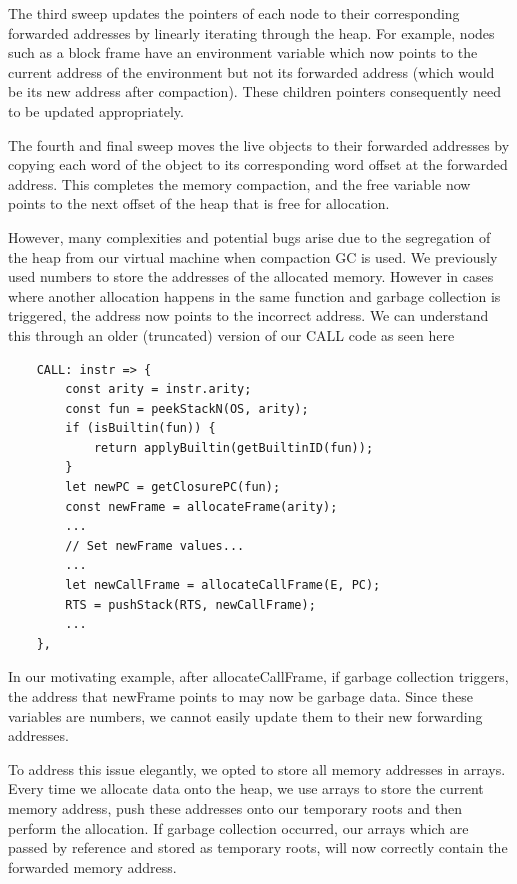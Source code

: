 \documentclass{report}
\begin{document}
The third sweep updates the pointers of each node to their corresponding forwarded addresses by linearly iterating through the heap. For example, nodes such as a block frame have an environment variable which now points to the current address of the environment but not its forwarded address (which would be its new address after compaction). These children pointers consequently need to be updated appropriately.

The fourth and final sweep moves the live objects to their forwarded addresses by copying each word of the object to its corresponding word offset at the forwarded address. This completes the memory compaction, and the free variable now points to the next offset of the heap that is free for allocation.

However, many complexities and potential bugs arise due to the segregation of the heap from our virtual machine when compaction GC is used. We previously used numbers to store the addresses of the allocated memory. However in cases where another allocation happens in the same function and garbage collection is triggered, the address now points to the incorrect address. We can understand this through an older (truncated) version of our CALL code as seen here

\begin{verbatim}
    CALL: instr => {
        const arity = instr.arity;
        const fun = peekStackN(OS, arity);
        if (isBuiltin(fun)) {
            return applyBuiltin(getBuiltinID(fun));
        }
        let newPC = getClosurePC(fun);
        const newFrame = allocateFrame(arity);
        ...
        // Set newFrame values...
        ...
        let newCallFrame = allocateCallFrame(E, PC);
        RTS = pushStack(RTS, newCallFrame);
        ...
    },
\end{verbatim}

In our motivating example, after allocateCallFrame, if garbage collection triggers, the address that newFrame points to may now be garbage data. Since these variables are numbers, we cannot easily update them to their new forwarding addresses. 

To address this issue elegantly, we opted to store all memory addresses in arrays. Every time we allocate data onto the heap, we use arrays to store the current memory address, push these addresses onto our temporary roots and then perform the allocation. If garbage collection occurred, our arrays which are passed by reference and stored as temporary roots, will now correctly contain the forwarded memory address.
\end{document}
